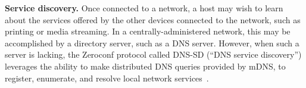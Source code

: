 \textbf{Service discovery.}
Once connected to a network, a host may wish to learn about the services offered by the other devices connected to the network, such as printing or media streaming.
In a centrally-administered network, this may be accomplished by a directory server, such as a DNS server.
However, when such a server is lacking, the Zeroconf protocol called DNS-SD (``DNS service discovery'') leverages the ability to make distributed DNS queries provided by mDNS, to register, enumerate, and resolve local network services~\cite{rfc6763}.
